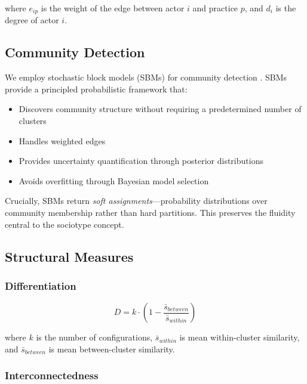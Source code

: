 \documentclass[../main.tex]{subfiles}
\begin{document}
where $e_{ip}$ is the weight of the edge between actor $i$ and practice $p$, and $d_i$ is the degree of actor $i$.

\subsection{Community Detection}

We employ stochastic block models (SBMs) for community detection \cite{peixoto2019bayesian}. SBMs provide a principled probabilistic framework that:

\begin{itemize}
    \item Discovers community structure without requiring a predetermined number of clusters
    \item Handles weighted edges
    \item Provides uncertainty quantification through posterior distributions
    \item Avoids overfitting through Bayesian model selection
\end{itemize}

Crucially, SBMs return \textit{soft assignments}---probability distributions over community membership rather than hard partitions. This preserves the fluidity central to the sociotype concept.

\subsection{Structural Measures}

\subsubsection{Differentiation}

\begin{equation}
    D = k \cdot \left(1 - \frac{\bar{s}_{between}}{\bar{s}_{within}}\right)
\end{equation}

where $k$ is the number of configurations, $\bar{s}_{within}$ is mean within-cluster similarity, and $\bar{s}_{between}$ is mean between-cluster similarity.

\subsubsection{Interconnectedness}
\end{document}
